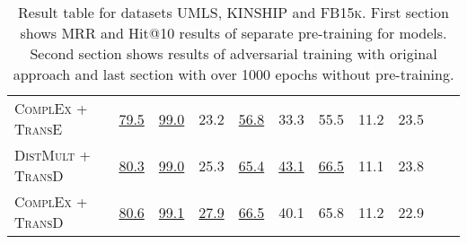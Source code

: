 \begin{table}[h]
\begin{tabular}{lllllllllll}
        \textsc{ComplEx} + \textsc{TransE}
         & \underline{79.5}
         & \underline{99.0}
         & 23.2 
         & \underline{56.8}
         & 33.3 
         & 55.5
         & 11.2
         & 23.5\\
          
        \textsc{DistMult} + \textsc{TransD}
         & \underline{80.3}
         & \underline{99.0}
         & 25.3 
         & \underline{65.4} 
         & \underline{43.1} 
         & \underline{66.5}
         & 11.1
         & 23.8\\
        
        \textsc{ComplEx} + \textsc{TransD}
         & \underline{80.6}  
         & \underline{99.1} 
         & \underline{27.9}
         & \underline{66.5}
         & 40.1 
         & 65.8
         & 11.2
         & 22.9\\
        \bottomrule
    \end{tabular}
    \caption{Result table for datasets \textsc{UMLS}, \textsc{KINSHIP} and \textsc{FB15k}.
    First section shows MRR and Hit@10 results of separate pre-training for models.
    Second section shows results of adversarial training with original \kbgan approach and last section with \usgan over 1000 epochs without pre-training.}
\label{tab:results_small_datasets}
\end{table}